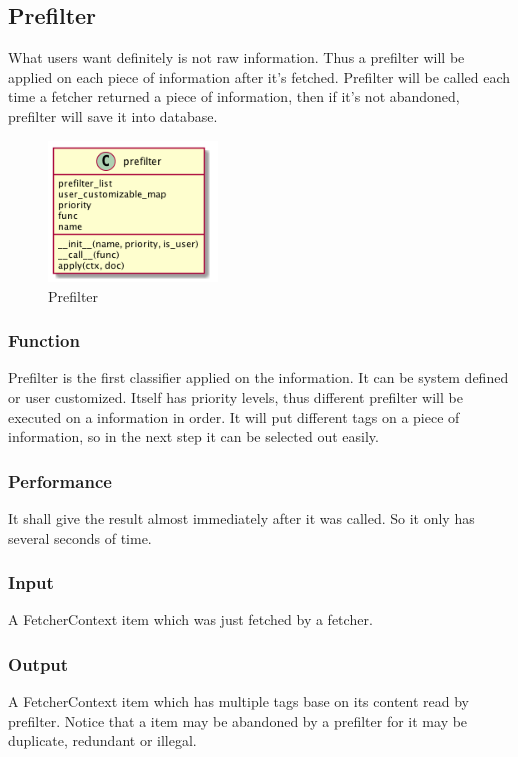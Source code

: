 
\subsection{Prefilter}
  What users want definitely is not raw information. Thus a prefilter will be applied on each piece of information after it's fetched.
  Prefilter will be called each time a fetcher returned a piece of information, then if it's not abandoned, prefilter will save it into database.

  \begin{figure}[H]
    \centering
    \includegraphics[width=0.4\textwidth]{img/prefilter.png}
    \caption{Prefilter\label{fig:prefilter}}
  \end{figure}

  \subsubsection{Function}
    Prefilter is the first classifier applied on the information. It can be system defined or user customized.
    Itself has priority levels, thus different prefilter will be executed on a information in order.
    It will put different tags on a piece of information, so in the next step it can be selected out easily.

  \subsubsection{Performance}
    It shall give the result almost immediately after it was called. So it only has several seconds of time.

  \subsubsection{Input}
    A FetcherContext item which was just fetched by a fetcher.

  \subsubsection{Output}
    A FetcherContext item which has multiple tags base on its content read by prefilter.
    Notice that a item may be abandoned by a prefilter for it may be duplicate, redundant or illegal.

